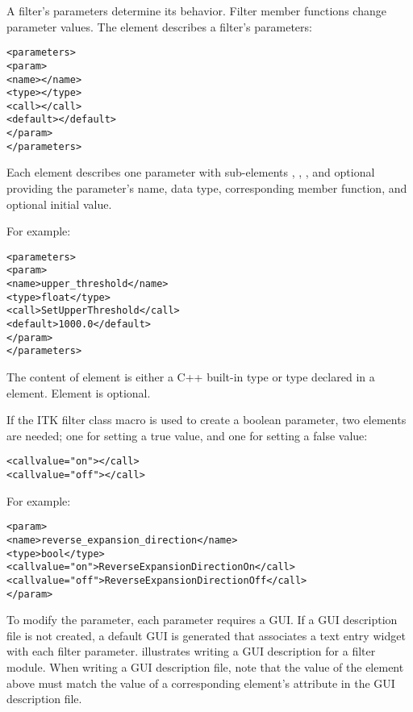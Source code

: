 A filter's parameters determine its behavior.  Filter member functions
change parameter values.  The  element
describes a filter's parameters:

\begin{alltt}
  <parameters>
    <param>
      <name></name>
      <type></type>
      <call></call>
      <default></default>
    </param>
    \velide  
  </parameters>
\end{alltt}

Each  element describes one parameter with
sub-elements , ,
, and optional  providing the
parameter's name, data type, corresponding member function, and
optional initial value.

For example:

\begin{alltt}
  <parameters>
    <param>
      <name>upper\_threshold</name>
      <type>float</type>
      <call>SetUpperThreshold</call>
      <default>1000.0</default>
    </param>
  </parameters>
\end{alltt}

The content of element  is either a C++ built-in
type or type declared in a  element.  Element
 is optional.

If the ITK filter class macro  is used to create a
boolean parameter, two  elements are needed; one
for setting a true value, and one for setting a false value:

\begin{alltt}
  <call value="on"></call>
  <call value="off"></call>
\end{alltt}

For example:

\begin{alltt}
  <param>
    <name>reverse\_expansion\_direction</name>
    <type>bool</type>
    <call value="on">ReverseExpansionDirectionOn</call>
    <call value="off">ReverseExpansionDirectionOff</call>
  </param>
\end{alltt}


To modify the parameter, each parameter requires a GUI. If a GUI
description file is not created, a default GUI is generated that
associates a text entry widget with each filter parameter.
 illustrates 
writing a GUI description for a filter module.  When writing a GUI
description file, note that the value of the 
element above must match the value of a corresponding
 element's  attribute in the GUI
description file.

